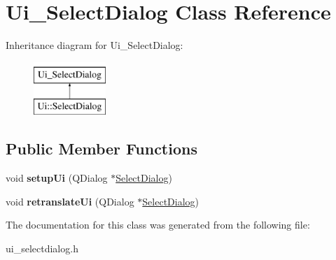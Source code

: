 \hypertarget{class_ui___select_dialog}{}\section{Ui\+\_\+\+Select\+Dialog Class Reference}
\label{class_ui___select_dialog}
Inheritance diagram for Ui\+\_\+\+Select\+Dialog\+:\begin{figure}[H]
\begin{center}
\leavevmode
\includegraphics[height=2.000000cm]{class_ui___select_dialog}
\end{center}
\end{figure}
\subsection*{Public Member Functions}
\begin{DoxyCompactItemize}
\item 
\mbox{\label{class_ui___select_dialog_abdb56e4111bc4c1a3145811084647974}} 
void {\bfseries setup\+Ui} (Q\+Dialog $\ast$\hyperlink{class_select_dialog}{Select\+Dialog})
\item 
\mbox{\label{class_ui___select_dialog_ae7dbc45a4f195c5b3f05abaac2c9f237}} 
void {\bfseries retranslate\+Ui} (Q\+Dialog $\ast$\hyperlink{class_select_dialog}{Select\+Dialog})
\end{DoxyCompactItemize}


The documentation for this class was generated from the following file\+:\begin{DoxyCompactItemize}
\item 
ui\+\_\+selectdialog.\+h\end{DoxyCompactItemize}
